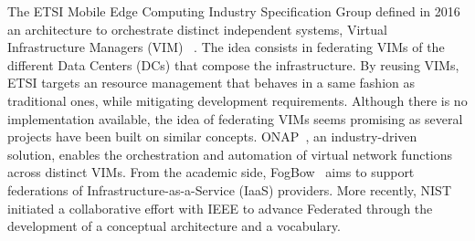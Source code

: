 




%
The ETSI Mobile Edge Computing Industry Specification Group
defined in 2016 an architecture to orchestrate distinct
independent \cloud systems, \aka Virtual
Infrastructure Managers (VIM) ~\cite{7574435}.
%
The idea consists in federating VIMs of the different Data Centers (DCs) that
compose the \edge infrastructure.  By reusing VIMs, ETSI targets an
\edgecomputing
resource management that behaves in a same fashion as traditional ones, 
while mitigating development requirements.
%
Although there is no implementation available, the idea of federating
VIMs seems promising as several projects have been built on similar
concepts. ONAP~\cite{onap}, an industry-driven solution,
enables the orchestration and automation of virtual network functions
across distinct VIMs. From the academic side, FogBow~\cite{brasileiro2016fogbow} aims to support federations
of Infrastructure-as-a-Service (IaaS) providers. More recently, NIST
initiated a collaborative effort with IEEE to advance Federated
\cloud through the development of a conceptual architecture and a
vocabulary.

